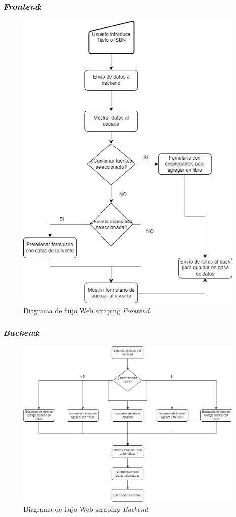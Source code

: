 \subsubsection{\textit{Frontend}:}
\begin{figure}[htbp]
    \centering
    \includegraphics[width=0.7\linewidth]{Imagenes/Front web scraping.png}
    \caption{Diagrama de flujo Web scraping \textit{Frontend}}
    \label{Diagrama de flujo Web scraping Frontend}
\end{figure}
\FloatBarrier

\newpage
\subsubsection{\textit{Backend}:}
\begin{figure}[htbp]
    \centering
    \includegraphics[width=1\linewidth]{Imagenes/Back web scraping.png}
    \caption{Diagrama de flujo Web scraping \textit{Backend}}
    \label{Diagrama de flujo Web scraping Backend}
\end{figure}
\FloatBarrier

